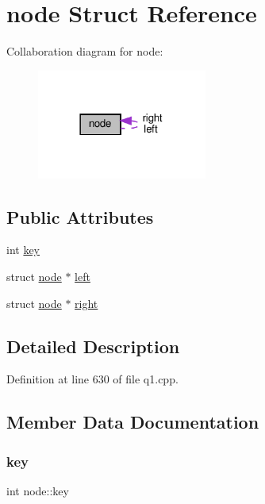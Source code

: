 \hypertarget{structnode}{}\section{node Struct Reference}
\label{structnode}


Collaboration diagram for node\+:
\nopagebreak
\begin{figure}[H]
\begin{center}
\leavevmode
\includegraphics[width=158pt]{structnode__coll__graph}
\end{center}
\end{figure}
\subsection*{Public Attributes}
\begin{DoxyCompactItemize}
\item 
int \hyperlink{structnode_aa1417e7fad3ebcf42dc0ec8b711f273d}{key}
\item 
struct \hyperlink{structnode}{node} $\ast$ \hyperlink{structnode_a3ce38490a651bfda86d88ff955e96abc}{left}
\item 
struct \hyperlink{structnode}{node} $\ast$ \hyperlink{structnode_a51e160f22dc6064bac4a4f9f1d931c2c}{right}
\end{DoxyCompactItemize}


\subsection{Detailed Description}


Definition at line 630 of file q1.\+cpp.



\subsection{Member Data Documentation}
\mbox{\label{structnode_aa1417e7fad3ebcf42dc0ec8b711f273d}} 
\subsubsection{\texorpdfstring{key}{key}}
{\footnotesize\ttfamily int node\+::key}



